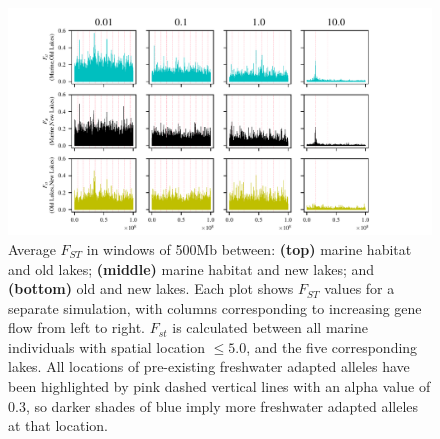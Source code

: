 \documentclass{article}
\begin{document}
\begin{figure}
    \begin{center}
          \includegraphics[width=1.0\linewidth]{Final_Plots/Fst_Genome_faa_0_5_500.pdf}
          \caption{
        Average $F_{ST}$ in windows of 500Mb between:
                \textbf{(top)} marine habitat and old lakes;
                \textbf{(middle)} marine habitat and new lakes; and
                \textbf{(bottom)} old and new lakes.
                Each plot shows $F_{ST}$ values for a separate simulation,
                with columns corresponding to increasing gene flow from left to right.
        $F_{st}$ is calculated between all marine individuals with spatial location $\le 5.0$, and the five corresponding lakes.
        All locations of pre-existing freshwater adapted alleles have been highlighted by 
        pink dashed vertical lines with an alpha value of 0.3, so darker shades of blue imply more 
        freshwater adapted alleles at that location.
        }
          \label{fig:fst_5lakes}
    \end{center}
\end{figure}
\end{document}
